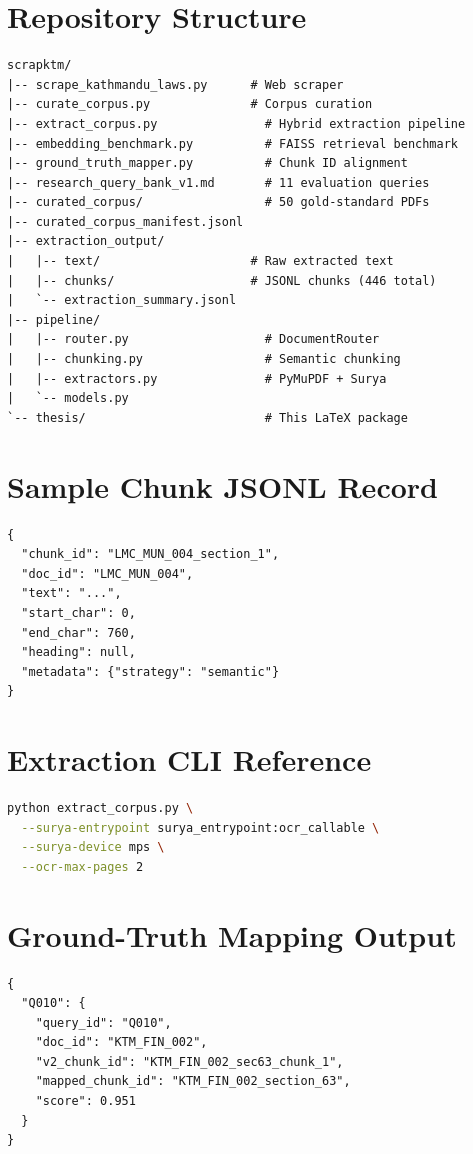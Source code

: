\appendix
\chapter{Repository Structure}
\label{app:repo}

\begin{lstlisting}[language={},caption={Key files in the \texttt{scrapktm} repository.}]
scrapktm/
|-- scrape_kathmandu_laws.py      # Web scraper
|-- curate_corpus.py              # Corpus curation
|-- extract_corpus.py               # Hybrid extraction pipeline
|-- embedding_benchmark.py          # FAISS retrieval benchmark
|-- ground_truth_mapper.py          # Chunk ID alignment
|-- research_query_bank_v1.md       # 11 evaluation queries
|-- curated_corpus/                 # 50 gold-standard PDFs
|-- curated_corpus_manifest.jsonl
|-- extraction_output/
|   |-- text/                     # Raw extracted text
|   |-- chunks/                   # JSONL chunks (446 total)
|   `-- extraction_summary.jsonl
|-- pipeline/
|   |-- router.py                   # DocumentRouter
|   |-- chunking.py                 # Semantic chunking
|   |-- extractors.py               # PyMuPDF + Surya
|   `-- models.py
`-- thesis/                         # This LaTeX package
\end{lstlisting}

\chapter{Sample Chunk JSONL Record}
\label{app:chunk-sample}

\begin{lstlisting}[language={},caption={Example chunk record from \texttt{LMC\_MUN\_004\_chunks.jsonl}.}]
{
  "chunk_id": "LMC_MUN_004_section_1",
  "doc_id": "LMC_MUN_004",
  "text": "...",
  "start_char": 0,
  "end_char": 760,
  "heading": null,
  "metadata": {"strategy": "semantic"}
}
\end{lstlisting}

\chapter{Extraction CLI Reference}
\label{app:cli}

\begin{lstlisting}[language=bash,caption={Hybrid extraction pipeline invocation.}]
python extract_corpus.py \
  --surya-entrypoint surya_entrypoint:ocr_callable \
  --surya-device mps \
  --ocr-max-pages 2
\end{lstlisting}

\chapter{Ground-Truth Mapping Output}
\label{app:gt-json}

\begin{lstlisting}[language={},caption={Excerpt from \texttt{ground\_truth\_mapping.json}.}]
{
  "Q010": {
    "query_id": "Q010",
    "doc_id": "KTM_FIN_002",
    "v2_chunk_id": "KTM_FIN_002_sec63_chunk_1",
    "mapped_chunk_id": "KTM_FIN_002_section_63",
    "score": 0.951
  }
}
\end{lstlisting}
